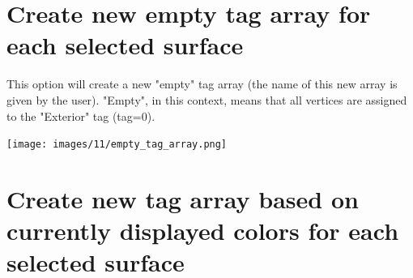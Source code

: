 \noindent



\section{Create new empty tag array for each selected surface}\label{empty_tag_array}


\begin{minipage}{0.5\textwidth}
This option will create a new "empty" tag array (the name of this new array is given by the user). "Empty", in this context, means that all vertices are assigned to the "Exterior" tag (tag=0). 
\end{minipage} 

\begin{minipage}{0.5\textwidth}\centering
  \texttt{[image: images/11/empty\_tag\_array.png]}
 \end{minipage} 



\section{Create new tag array based on currently displayed colors for each selected surface}

